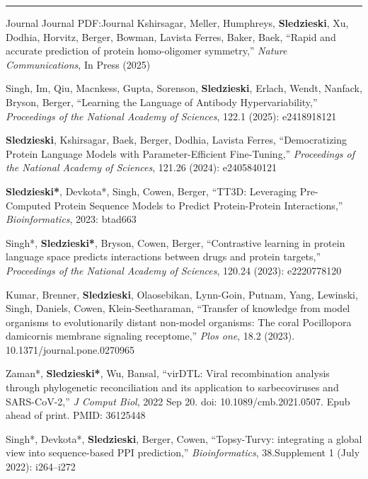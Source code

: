 \documentclass[letterpaper,MMMyyyy,nonstopmode]{simpleresumecv}
\begin{document}
\begin{Body}
\BigGap
\hrule
\Section
{Journal}
{Journal}
{PDF:Journal}
\Gap
\NumberedItem{[9]}
{{Kshirsagar, Meller, Humphreys, \textbf{Sledzieski}, Xu, Dodhia, Horvitz, Berger, Bowman, Lavista Ferres, Baker, Baek}, 
``Rapid and accurate prediction of protein homo-oligomer symmetry,'' 
 \textit{Nature Communications}, In Press (2025)
}

\Gap
\NumberedItem{[8]}
{{Singh, Im, Qiu, Macnkess, Gupta, Sorenson, \textbf{Sledzieski}, Erlach, Wendt, Nanfack, Bryson, Berger}, 
``Learning the Language of Antibody Hypervariability,'' 
 \textit{Proceedings of the National Academy of Sciences}, 122.1 (2025): e2418918121
}

\Gap
\NumberedItem{[7]}
{{\textbf{Sledzieski}, Kshirsagar, Baek, Berger, Dodhia, Lavista Ferres}, 
``Democratizing Protein Language Models with Parameter-Efficient Fine-Tuning,'' 
 \textit{Proceedings of the National Academy of Sciences}, 121.26 (2024): e2405840121
}

\Gap
\NumberedItem{[6]}
{{\textbf{Sledzieski*}, Devkota*, Singh, Cowen, Berger}, 
``TT3D: Leveraging Pre-Computed Protein Sequence Models to Predict Protein-Protein Interactions,'' 
 \textit{Bioinformatics}, 2023: btad663
}

\Gap
\NumberedItem{[5]}
{{Singh*, \textbf{Sledzieski*}, Bryson, Cowen, Berger}, 
``Contrastive learning in protein language space predicts interactions between drugs and protein targets,'' 
 \textit{Proceedings of the National Academy of Sciences}, 120.24 (2023): e2220778120
}

\Gap
\NumberedItem{[4]}
{{Kumar, Brenner, \textbf{Sledzieski}, Olaosebikan, Lynn-Goin, Putnam, Yang, Lewinski, Singh, Daniels, Cowen, Klein-Seetharaman}, 
``Transfer of knowledge from model organisms to evolutionarily distant non-model organisms: The coral Pocillopora damicornis membrane signaling receptome,'' 
 \textit{Plos one}, 18.2 (2023). 10.1371/journal.pone.0270965
}

\Gap
\NumberedItem{[3]}
{{Zaman*, \textbf{Sledzieski*}, Wu, Bansal}, 
``virDTL: Viral recombination analysis through phylogenetic reconciliation and its application to sarbecoviruses and SARS-CoV-2,'' 
 \textit{J Comput Biol}, 2022 Sep 20. doi: 10.1089/cmb.2021.0507. Epub ahead of print. PMID: 36125448
}

\Gap
\NumberedItem{[2]}
{{Singh*, Devkota*, \textbf{Sledzieski}, Berger, Cowen}, 
``Topsy-Turvy: integrating a global view into sequence-based PPI prediction,'' 
 \textit{Bioinformatics}, 38.Supplement 1 (July 2022): i264–i272
}


\end{Body}
\end{document}

